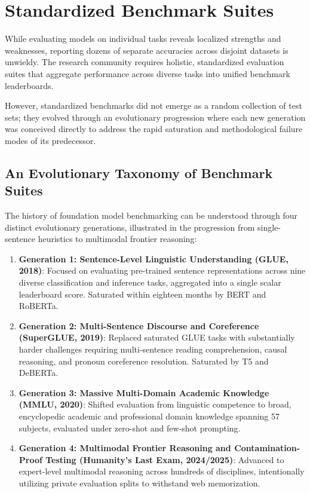 \documentclass[../../main.tex]{subfiles}
\begin{document}
\clearpage

\section{Standardized Benchmark Suites}
\label{sec:benchmarks_contamination}

While evaluating models on individual tasks reveals localized strengths and weaknesses, reporting dozens of separate accuracies across disjoint datasets is unwieldy. The research community requires holistic, standardized evaluation suites that aggregate performance across diverse tasks into unified benchmark leaderboards.

However, standardized benchmarks did not emerge as a random collection of test sets; they evolved through an evolutionary progression where each new generation was conceived directly to address the rapid saturation and methodological failure modes of its predecessor.

\subsection{An Evolutionary Taxonomy of Benchmark Suites}
\label{subsec:benchmark_evolutionary_taxonomy}

The history of foundation model benchmarking can be understood through four distinct evolutionary generations, illustrated in the progression from single-sentence heuristics to multimodal frontier reasoning:
\begin{enumerate}
    \item \textbf{Generation 1: Sentence-Level Linguistic Understanding (GLUE, 2018)}: Focused on evaluating pre-trained sentence representations across nine diverse classification and inference tasks, aggregated into a single scalar leaderboard score. Saturated within eighteen months by BERT and RoBERTa.
    \item \textbf{Generation 2: Multi-Sentence Discourse and Coreference (SuperGLUE, 2019)}: Replaced saturated GLUE tasks with substantially harder challenges requiring multi-sentence reading comprehension, causal reasoning, and pronoun coreference resolution. Saturated by T5 and DeBERTa.
    \item \textbf{Generation 3: Massive Multi-Domain Academic Knowledge (MMLU, 2020)}: Shifted evaluation from linguistic competence to broad, encyclopedic academic and professional domain knowledge spanning 57 subjects, evaluated under zero-shot and few-shot prompting.
    \item \textbf{Generation 4: Multimodal Frontier Reasoning and Contamination-Proof Testing (Humanity's Last Exam, 2024/2025)}: Advanced to expert-level multimodal reasoning across hundreds of disciplines, intentionally utilizing private evaluation splits to withstand web memorization.
\end{enumerate}
\end{document}
